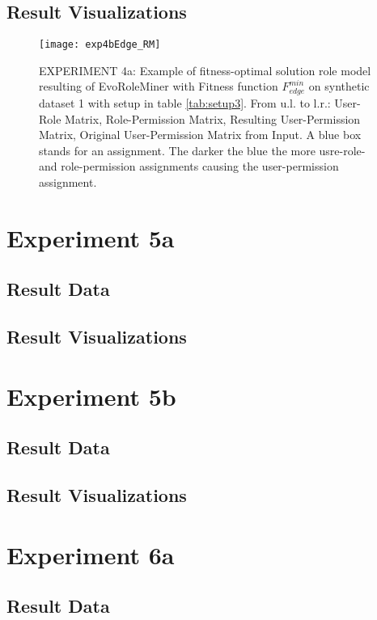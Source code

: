	\subsection{Result Visualizations}
	\label{sec:A_Exp4b_Diagrams}
		\begin{figure}[H]
			\centering
			\texttt{[image: exp4bEdge\_RM]}
			\caption{EXPERIMENT 4a: Example of fitness-optimal solution role model resulting of EvoRoleMiner with Fitness function $F_{edge}^{min}$ on synthetic dataset 1 with setup in table \ref{tab:setup3}. From u.l. to l.r.: User-Role Matrix, Role-Permission Matrix, Resulting User-Permission Matrix, Original User-Permission Matrix from Input. A blue box stands for an assignment. The darker the blue the more usre-role- and role-permission assignments causing the user-permission assignment.}
			\label{fig:exp4bEdge_RM}
		\end{figure}

\section{Experiment 5a}
\label{sec:A_Exp5a}
	\subsection{Result Data}
	\label{sec:A_Exp5a_Data}
	\subsection{Result Visualizations}
	\label{sec:A_Exp5a_Diagrams}

\section{Experiment 5b}
\label{sec:A_Exp5b}
	\subsection{Result Data}
	\label{sec:A_Exp5b_Data}
	\subsection{Result Visualizations}
	\label{sec:A_Exp5b_Diagrams}

\section{Experiment 6a}
\label{sec:A_Exp6a}
	\subsection{Result Data}
	\label{sec:A_Exp6a_Data}
